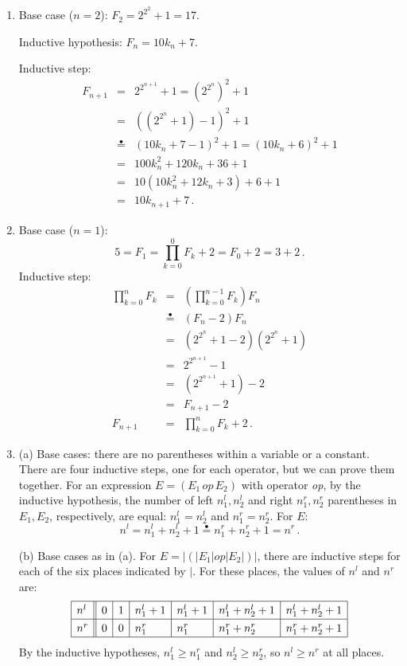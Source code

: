 \documentclass[11pt,a4paper]{report}
\newcommand*{\ih}{\stackrel{\bullet}{=}}
\begin{document}
\begin{enumerate}
\item Base case ($n=2$): $F_2=2^{2^2}+1=17$.

Inductive hypothesis: $F_n=10k_n+7$.

Inductive step:
\begin{eqnarray*}
F_{n+1}&=&2^{2^{n+1}}+1=\left(2^{2^{n}}\right)^2+1\\
&=&\left(\left(2^{2^{n}}+1\right)-1\right)^2+1\\
&\ih&(10k_n+7-1)^2+1=(10k_n+6)^2+1\\
&=&100k_n^2+120k_n+36+1\\
&=&10(10k_n^2+12k_n+3)+6+1\\
&=&10k_{n+1}+7\,.
\end{eqnarray*}

\item
Base case ($n=1$):
\[
5=F_1=\prod_{k=0}^{0} F_k + 2=F_0+2=3+2\,.
\]
Inductive step:
\begin{eqnarray*}
\prod_{k=0}^{n}F_k&=&(\prod_{k=0}^{n-1}F_k) F_n \\
&\ih& (F_n-2)F_n\\
&=& (2^{2^n}+1-2)(2^{2^n}+1)\\
&=& 2^{2^{n+1}}-1\\
&=& (2^{2^{n+1}}+1)-2\\
&=&F_{n+1}-2\\
F_{n+1}&=&\prod_{k=0}^{n}F_k + 2\,.
\end{eqnarray*}

\item (a) Base cases: there are no parentheses within a variable or a constant. There are four inductive steps, one for each operator, but we can prove them together. For an expression $E=(E_1 \,\textit{op}\, E_2)$ with operator \textit{op}, by the inductive hypothesis, the number of left $n_1^l,n_2^l$ and right $n_1^r,n_2^r$ parentheses in $E_1,E_2$, respectively, are equal: $n_1^l=n_2^l$ and $n_1^r=n_2^r$. For $E$:
\[
n^l=n_1^l+n_2^l+1\ih{}n_1^r+n_2^r+1=n^r\,.
\]

(b) Base cases as in (a). For $E=|(|E_1 | \textit{op} | E_2|)|$, there are inductive steps for each of the six places indicated by $|$. For these places, the values of $n^l$ and $n^r$ are:
\[
\renewcommand{\arraystretch}{1.3}
\begin{array}{|l||l|l|l|l|l|l|}
\hline
n^l&0& 1& n_1^l+1& n_1^l+1& n_1^l+n_2^l+1& n_1^l+n_2^l+1\\\hline
n^r&0& 0& n_1^r& n_1^r& n_1^r+n_2^r& n_1^r+n_2^r+1\\\hline
\end{array}
\]
By the inductive hypotheses, $n_1^l \geq n_1^r$ and $n_2^l \geq n_2^r$, so $n^l\geq n^r$ at all places.


\end{enumerate}
\end{document}
